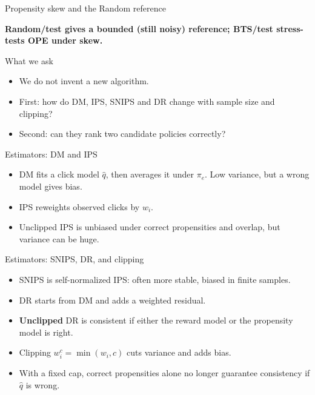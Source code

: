 \documentclass[aspectratio=169,12pt]{beamer}
\newcommand{\pe}{\pi_e}
\newcommand{\speak}[1]{\begin{itemize}\setlength{\itemsep}{0.42em}\setlength{\parskip}{0pt}#1\end{itemize}}
\begin{document}
\begin{frame}{Propensity skew and the Random reference}
\vspace{2.5mm}
{\footnotesize\bfseries\color{navy} Random/test gives a bounded (still noisy) reference; BTS/test stress-tests OPE under skew.\par}
\end{frame}
\endgroup

\begin{frame}{What we ask}
\speak{
\item We do not invent a new algorithm.
\item First: how do DM, IPS, SNIPS and DR change with sample size and clipping?
\item Second: can they rank two candidate policies correctly?
}
\end{frame}

\begin{frame}{Estimators: DM and IPS}
\speak{
\item DM fits a click model $\widehat q$, then averages it under $\pe$. Low variance, but a wrong model gives bias.
\item IPS reweights observed clicks by $w_i$.
\item Unclipped IPS is unbiased under correct propensities and overlap, but variance can be huge.
}
\end{frame}

\begin{frame}{Estimators: SNIPS, DR, and clipping}
\speak{
\item SNIPS is self-normalized IPS: often more stable, biased in finite samples.
\item DR starts from DM and adds a weighted residual.
\item \textbf{Unclipped} DR is consistent if either the reward model or the propensity model is right.
\item Clipping $w_i^c=\min(w_i,c)$ cuts variance and adds bias.
\item With a fixed cap, correct propensities alone no longer guarantee consistency if $\widehat q$ is wrong.
}
\end{frame}
\end{document}
